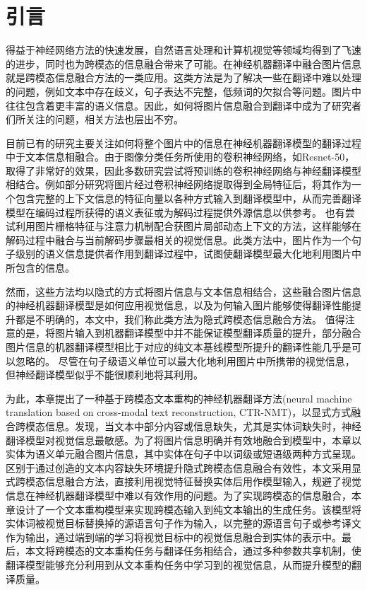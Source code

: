 \section{引言}
得益于神经网络方法的快速发展，自然语言处理和计算机视觉等领域均得到了飞速的进步，同时也为跨模态的信息融合带来了可能。在神经机器翻译中融合图片信息就是跨模态信息融合方法的一类应用。这类方法是为了解决一些在翻译中难以处理的问题，例如文本中存在歧义，句子表达不完整，低频词的欠拟合等问题。图片中往往包含着更丰富的语义信息。因此，如何将图片信息融合到翻译中成为了研究者们所关注的问题，相关方法也层出不穷。

目前已有的研究主要关注如何将整个图片中的信息在神经机器翻译模型的翻译过程中于文本信息相融合。由于图像分类任务所使用的卷积神经网络，如Resnet-50，取得了非常好的效果，因此多数研究尝试将预训练的卷积神经网络与神经翻译模型相结合。例如部分研究将图片经过卷积神经网络提取得到全局特征后，将其作为一个包含完整的上下文信息的特征向量以各种方式输入到翻译模型中，从而完善翻译模型在编码过程所获得的语义表征或为解码过程提供外源信息以供参考。
也有尝试利用图片栅格特征与注意力机制配合获图片局部动态上下文的方法，这样能够在解码过程中融合与当前解码步骤最相关的视觉信息。此类方法中，图片作为一个句子级别的语义信息提供者作用到翻译过程中，试图使翻译模型最大化地利用图片中所包含的信息。

然而，这些方法均以隐式的方式将图片信息与文本信息相结合，这些融合图片信息的神经机器翻译模型是如何应用视觉信息，以及为何输入图片能够使得翻译性能提升都是不明确的，本文中，我们称此类方法为隐式跨模态信息融合方法。
值得注意的是，将图片输入到机器翻译模型中并不能保证模型翻译质量的提升，部分融合图片信息的机器翻译模型相比于对应的纯文本基线模型所提升的翻译性能几乎是可以忽略的。
尽管在句子级语义单位可以最大化地利用图片中所携带的视觉信息，但神经翻译模型似乎不能很顺利地将其利用。

为此，本章提出了一种基于跨模态文本重构的神经机器翻译方法(neural machine translation based on cross-modal text reconstruction, CTR-NMT)，以显式方式融合跨模态信息。发现，当文本中部分内容或信息缺失，尤其是实体词缺失时，神经翻译模型对视觉信息最敏感。为了将图片信息明确并有效地融合到模型中，本章以实体为语义单元融合图片信息，其中实体在句子中以词级或短语级两种方式呈现。区别于通过创造的文本内容缺失环境提升隐式跨模态信息融合有效性，本文采用显式跨模态信息融合方法，直接利用视觉特征替换实体后用作模型输入，规避了视觉信息在神经机器翻译模型中难以有效作用的问题。为了实现跨模态的信息融合，本章设计了一个文本重构模型来实现跨模态输入到纯文本输出的生成任务。该模型将实体词被视觉目标替换掉的源语言句子作为输入，以完整的源语言句子或参考译文作为输出，通过端到端的学习将视觉目标中的视觉信息融合到实体的表示中。最后，本文将跨模态的文本重构任务与翻译任务相结合，通过多种参数共享机制，使翻译模型能够充分利用到从文本重构任务中学习到的视觉信息，从而提升模型的翻译质量。


